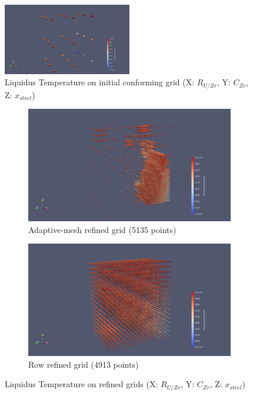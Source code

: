 \documentclass[11pt]{article}\usepackage{geometry} \geometry{letterpaper, margin=25.4mm}
\begin{document}
\begin{figure}[H]
\centering
 \centering \includegraphics[width=0.5\textwidth]{figures/CalphadBasedEOSTest/TabulatedBases/Tab0.png} 
\caption{{Liquidus Temperature on initial conforming grid (X: $R_{U/Zr}$, Y: $C_{Zr}$, Z: $x_{steel}$})} \label{fig:Tab0} 
\end{figure}
\begin{figure}[H]
\centering
\begin{subfigure}[t]{0.48\textwidth}
 \centering \includegraphics[width=\textwidth]{figures/CalphadBasedEOSTest/TabulatedBases/TabOpt4_c5.png}
\caption{Adaptive-mesh refined grid (5135 points)} \label{fig:TabOptRefined} 
\end{subfigure}

\begin{subfigure}[t]{0.48\textwidth}
 \centering \includegraphics[width=\textwidth]{figures/CalphadBasedEOSTest/TabulatedBases/Tab2_inter2.png}
\caption{Row refined grid (4913 points)} \label{fig:TabRowRefined} 
\end{subfigure}
\caption{Liquidus Temperature on refined grids (X: $R_{U/Zr}$, Y: $C_{Zr}$, Z: $x_{steel}$)}
\end{figure}
\end{document}
